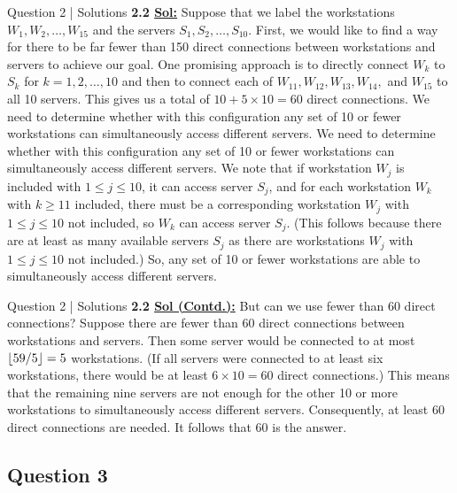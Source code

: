 \documentclass[xcolor=svgnames]{beamer}
\DeclarePairedDelimiter\floor{\lfloor}{\rfloor}
\begin{document}
\begin{frame}{Question 2 | Solutions}
    \textbf{2.2 \underline{Sol:}} Suppose that we label the workstations $W_1, W_2, \ldots , W_{15}$ and the servers $S_1, S_2, \ldots , S_{10}$. First, we would like to find a way for there to be far fewer than 150 direct connections between workstations and servers to achieve our goal. One promising approach is to directly connect $W_k$ to $S_k$ for $k = 1, 2, \ldots , 10$ and then to connect each of $W_{11}, W_{12}, W_{13}, W_{14},$ and $W_{15}$ to all 10 servers. This gives us a total of $10 + 5 \times 10 = 60$ direct connections. We need to determine whether with this configuration any set of 10 or fewer workstations can simultaneously access different servers. We need to determine whether with this configuration any set of 10 or fewer workstations can simultaneously access different servers. We note that if workstation $W_j$ is included with $1 \leq j \leq 10$, it can access server $S_j$, and for each workstation $W_k$ with $k \geq 11$ included, there must be a corresponding workstation $W_j$ with $1 \leq j \leq 10$ not included, so $W_k$ can access server $S_j$. (This follows because there are at least as many available servers $S_j$ as there are workstations $W_j$ with $1 \leq j \leq 10$ not included.) So, any set of 10 or fewer workstations are able to simultaneously access different servers.
\end{frame}

\begin{frame}{Question 2 | Solutions}
    \textbf{2.2 \underline{Sol (Contd.):}} But can we use fewer than 60 direct connections? Suppose there are fewer than 60 direct connections between workstations and servers. Then some server would be connected to at most $\floor{59/5} = 5$ workstations. (If all servers were connected to at least six workstations, there would be at least $6 \times 10 = 60$ direct connections.) This means that the remaining nine servers are not enough for the other 10 or more workstations to simultaneously access different servers. Consequently, at least 60 direct connections are needed. It follows that 60 is the answer. 
\end{frame}

\subsection{Question 3}
\end{document}
